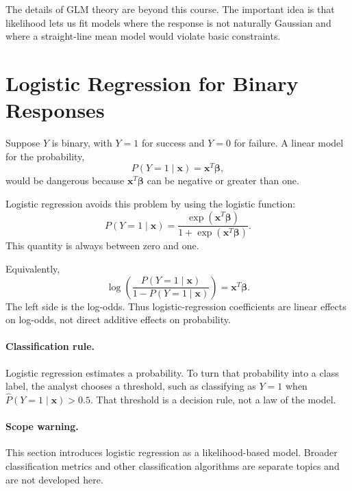 The details of GLM theory are beyond this course.  The important idea is that likelihood lets us fit models where the response is not naturally Gaussian and where a straight-line mean model would violate basic constraints.

\section{Logistic Regression for Binary Responses}

Suppose \(Y\) is binary, with \(Y=1\) for success and \(Y=0\) for failure.  A linear model for the probability,
\begin{equation}
  P(Y=1\mid \mathbf{x})=\mathbf{x}^T\boldsymbol{\beta},
\end{equation}
would be dangerous because \(\mathbf{x}^T\boldsymbol{\beta}\) can be negative or greater than one.

Logistic regression avoids this problem by using the logistic function:
\begin{equation}
  P(Y=1\mid \mathbf{x})
  =\frac{\exp(\mathbf{x}^T\boldsymbol{\beta})}
  {1+\exp(\mathbf{x}^T\boldsymbol{\beta})}.
  \label{eq:ch14-logistic-prob}
\end{equation}
This quantity is always between zero and one.

Equivalently,
\begin{equation}
  \log\left(\frac{P(Y=1\mid \mathbf{x})}{1-P(Y=1\mid \mathbf{x})}\right)
  =\mathbf{x}^T\boldsymbol{\beta}.
\end{equation}
The left side is the log-odds.  Thus logistic-regression coefficients are linear effects on log-odds, not direct additive effects on probability.

\paragraph{Classification rule.}
Logistic regression estimates a probability.  To turn that probability into a class label, the analyst chooses a threshold, such as classifying as \(Y=1\) when \(\widehat{P}(Y=1\mid\mathbf{x})>0.5\).  That threshold is a decision rule, not a law of the model.

\paragraph{Scope warning.}
This section introduces logistic regression as a likelihood-based model.  Broader classification metrics and other classification algorithms are separate topics and are not developed here.

